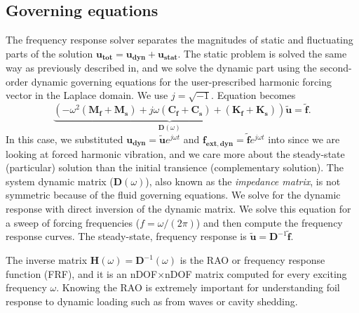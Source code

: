 \documentclass[10pt]{article}
\newcommand{\mbf}[1]{\mathbf{#1}}
\newcommand{\be}{\begin{eqnarray}}
\newcommand{\ee}{\end{eqnarray}}
\begin{document}
\subsection{Governing equations}
The {frequency response solver} separates the magnitudes of static and fluctuating parts of the solution
%
$\mbf{u_{tot}}= \mbf{{u}_{dyn}} + \mbf{u_{stat}}$.
%
The static problem is solved the same way as previously described in, and we solve the dynamic part using the second-order dynamic governing equations for the user-prescribed harmonic forcing vector in the Laplace domain.
We use $j = \sqrt{-1}$.
Equation becomes
\begin{equation}
	\label{eqn:dyn}
	\underbrace{
		\left(-\omega^2  \left(\mbf{M_f + M_s}  \right) +
		j\omega    \left(\mbf{C_f +C_s}\right) + \left(\mbf{K_f + K_s}\right) \right)
	}_{\mbf{D}(\omega)}
	\mbf{\tilde{u}}
	= \mbf{\tilde{f}}.
\end{equation}
%
In this case, we substituted $\mbf{u_{dyn}} =\mbf{\tilde{u}}e^{j \omega  t}$ and $\mbf{f_{ext,dyn}} = \mbf{\tilde{f}}e^{j \omega t}$ into  since we are looking at forced harmonic vibration, and we care more about the steady-state (particular) solution than the initial transience (complementary solution).
The system dynamic matrix ($\mbf{D}(\omega)$), also known as the \emph{impedance matrix}, is not symmetric because of the fluid governing equations.
We solve for the dynamic response with direct inversion of the dynamic matrix.
We solve this equation for a sweep of forcing frequencies ($f = \omega/(2 \pi)$) and then compute the frequency response curves.
The steady-state, frequency response is $\mbf{\tilde{u}} = \mbf{D}^{-1}\mbf{\tilde{f}}$.

The inverse matrix $\mbf{H}(\omega) = \mbf{D}^{-1}(\omega)$ is the RAO or frequency response function (FRF), and it is an nDOF$\times$nDOF matrix computed for every exciting frequency $\omega$.
Knowing the RAO is extremely important for understanding foil response to dynamic loading such as from waves or cavity shedding.

\clearpage
\end{document}
